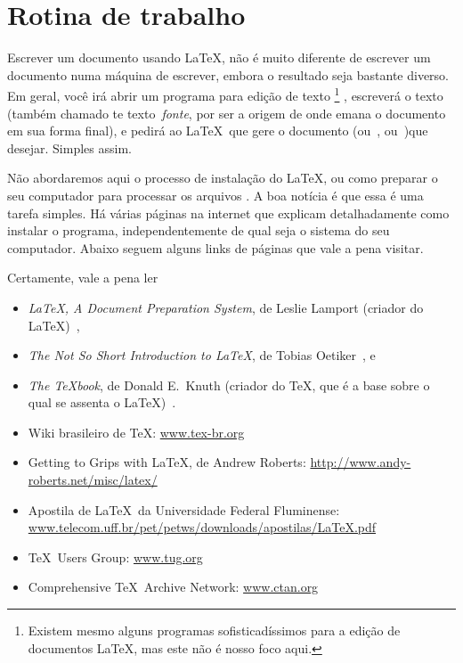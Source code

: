 \section{Rotina de trabalho}

Escrever um documento usando \LaTeX, não é muito diferente de escrever
um documento numa máquina de escrever, embora o resultado seja
bastante diverso. Em geral, você irá abrir um programa para edição
de texto%
\footnote{%
  Existem mesmo alguns programas sofisticadíssimos
  para a edição de documentos \LaTeX, mas este não é nosso foco
  aqui.}%
, escreverá o texto (também chamado te texto~\emph{fonte}, por ser a
origem de onde emana o documento em sua forma final), e pedirá ao \LaTeX\ que gere o
documento  (ou~, ou~)que
desejar. Simples assim.

Não abordaremos aqui o processo de instalação do \LaTeX, ou como
preparar o seu computador para processar os arquivos . A
boa notícia é que essa é uma tarefa simples. Há várias páginas na
internet que explicam detalhadamente como instalar o programa,
independentemente de qual seja o sistema do seu computador. Abaixo seguem
alguns links de páginas que vale a pena visitar.

Certamente, vale a pena ler 
\begin{itemize}
\item \emph{\LaTeX, A Document Preparation System}, de Leslie Lamport
  (criador do \LaTeX)~\cite{lamport},
\item \emph{The Not So Short Introduction to \LaTeX}, de Tobias Oetiker~\cite{lshort},  e
\item \emph{The \TeX book}, de Donald E.~Knuth (criador do \TeX, que é
  a base sobre o qual se assenta o \LaTeX)~\cite{texbook}.
\item Wiki brasileiro de \TeX: \url{www.tex-br.org}
\item Getting to Grips with \LaTeX, de Andrew Roberts: \url{http://www.andy-roberts.net/misc/latex/}
\item Apostila de \LaTeX\ da Universidade Federal Fluminense: \url{www.telecom.uff.br/pet/petws/downloads/apostilas/LaTeX.pdf}
\item \TeX\ Users Group: \url{www.tug.org}
\item Comprehensive \TeX\ Archive Network: \url{www.ctan.org}
\end{itemize}

